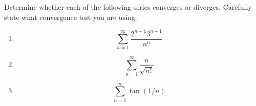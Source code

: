 \documentclass[12pt]{article}
\begin{document}
Determine whether each of the following series converges or diverges.
Carefully state what convergence test you are using.

\begin{enumerate}
\item


$$\sum_{n=1}^\infty \frac{2^{n-1}3^{n-1}}{n^n}$$

\vspace{2in}

\item

$$\sum_{n=1}^\infty \frac{n}{\sqrt{n!}}$$


\vspace{2in}

\item

$$\sum_{n=1}^\infty \tan(1/n)$$

\end{enumerate}
\end{document}
